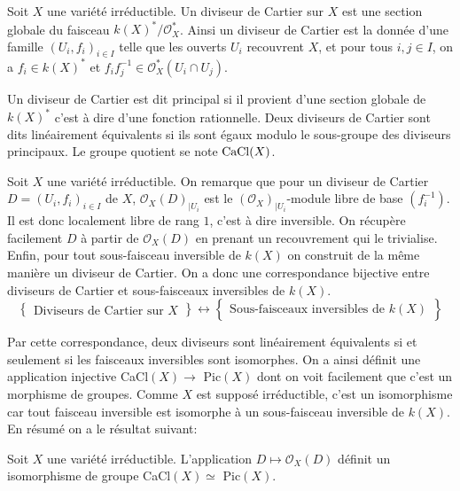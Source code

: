 \begin{defn}
Soit $X$ une variété irréductible. Un diviseur de Cartier sur $X$ est une section globale du faisceau $k(X)^*/\mathcal{O}_X^*$. Ainsi un diviseur de Cartier est la donnée d'une famille $(U_i, f_i)_{i\in I}$ telle que les ouverts $U_i$ recouvrent $X$, et pour tous $i,j \in I$, on a $f_i\in k(X)^*$ et $f_if_j^{-1}\in \mathcal{O}_X^*(U_i\cap U_j)$.

Un diviseur de Cartier est dit principal si il provient d'une section globale de $k(X)^*$ c'est à dire d'une fonction rationnelle. Deux diviseurs de Cartier sont dits linéairement équivalents si ils sont égaux modulo le sous-groupe des diviseurs principaux. Le groupe quotient se note $\operatorname{CaCl}(X)$.
\end{defn}





Soit $X$ une variété irréductible. On remarque que pour un diviseur de Cartier $D=(U_i, f_i)_{i\in I}$ de $X$, $\mathcal{O}_X(D)_{|U_i}$ est le $(\mathcal{O}_X)_{|U_i}$-module libre de base $(f_i^{-1})$. Il est donc localement libre de rang $1$, c'est à dire inversible. On récupère facilement $D$ à partir de $\mathcal{O}_X(D)$ en prenant un recouvrement qui le trivialise. Enfin, pour tout sous-faisceau inversible de $k(X)$ on construit de la même manière un diviseur de Cartier. On a donc une correspondance bijective entre diviseurs de Cartier et sous-faisceaux inversibles de $k(X)$. 
$$
\left\{
\begin{matrix}
\text{Diviseurs de Cartier sur }X
\end{matrix}
\right\}
\leftrightarrow
\left\{
\begin{matrix}
\text{Sous-faisceaux inversibles de } k(X)
\end{matrix}
\right\}
$$

Par cette correspondance, deux diviseurs sont linéairement équivalents si et seulement si les faisceaux inversibles sont isomorphes. On a ainsi définit une application injective CaCl$(X)\rightarrow$ Pic$(X)$ dont on voit facilement que c'est un morphisme de groupes. Comme $X$ est supposé irréductible, c'est un isomorphisme car tout faisceau inversible est isomorphe à un sous-faisceau inversible de $k(X)$. En résumé on a le résultat suivant:


\begin{prop}\label{isopic}
Soit $X$ une variété irréductible. L'application $D\mapsto \mathcal{O}_X(D)$ définit un isomorphisme de groupe CaCl$(X)\simeq $ Pic$(X)$.
\end{prop}


